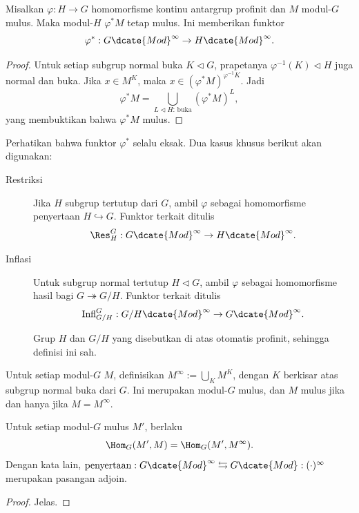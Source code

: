 \begin{definition-proposition}
	Misalkan $\varphi:H\to G$ homomorfisme kontinu antargrup profinit dan
$M$ modul-$G$ mulus. Maka modul-$H$ $\varphi^*M$ tetap mulus. Ini memberikan
	funktor
	\[ \varphi^*:G\dcate{Mod}^\infty\to H\dcate{Mod}^\infty. \]
\end{definition-proposition}
\begin{proof}
	Untuk setiap subgrup normal buka $K\lhd G$, prapetanya
	$\varphi^{-1}(K)\lhd H$ juga normal dan buka. Jika $x\in M^K$, maka
	$x\in(\varphi^*M)^{\varphi^{-1}K}$. Jadi
	\[ \varphi^*M=
	\bigcup_{L\lhd H:\,\text{buka}}(\varphi^*M)^L, \]
	yang membuktikan bahwa $\varphi^*M$ mulus.
\end{proof}

Perhatikan bahwa funktor $\varphi^*$ selalu eksak. Dua kasus khusus berikut
akan digunakan:
\begin{description}
	\item[Restriksi] Jika $H$ subgrup tertutup dari $G$, ambil $\varphi$ sebagai
	homomorfisme penyertaan $H\hookrightarrow G$. Funktor terkait ditulis
	\[ \Res^G_H:G\dcate{Mod}^\infty\to H\dcate{Mod}^\infty. \]
	\item[Inflasi] Untuk subgrup normal tertutup $H\lhd G$, ambil $\varphi$
	sebagai homomorfisme hasil bagi $G\twoheadrightarrow G/H$. Funktor terkait
	ditulis
	\[ \mathrm{Infl}^G_{G/H}:G/H\dcate{Mod}^\infty
	\to G\dcate{Mod}^\infty. \]

	Grup $H$ dan $G/H$ yang disebutkan di atas otomatis profinit, sehingga
	definisi ini sah.
\end{description}

\begin{definition-proposition}\label{def:smooth-part}
	Untuk setiap modul-$G$ $M$, definisikan
	$M^\infty:=\bigcup_KM^K$, dengan $K$ berkisar atas subgrup normal buka dari
	$G$. Ini merupakan modul-$G$ mulus, dan $M$ mulus jika dan hanya jika
	$M=M^\infty$.

	Untuk setiap modul-$G$ mulus $M'$, berlaku
	\[ \Hom_G(M',M)=\Hom_G(M',M^\infty). \]
	Dengan kata lain,
	$\text{penyertaan}:G\dcate{Mod}^\infty
	\leftrightarrows G\dcate{Mod}:(\cdot)^\infty$ merupakan pasangan adjoin.
\end{definition-proposition}
\begin{proof}
	Jelas.
\end{proof}

